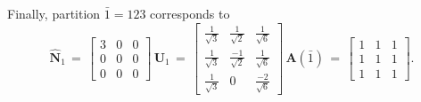 \documentclass[twocolumn,aps,sort,nofootinbib]{revtex4}
\begin{document}
Finally, partition ${\bar 1}=123$ corresponds to
\begin{subequations}
\begin{equation}
\mathbf{\hat{N}}_1\,=\,
\begin{bmatrix}
3 & 0 & 0\\
0 & 0 & 0\\
0 & 0 & 0
\end{bmatrix}
\,
\mathbf{U}_1\,=\,
\begin{bmatrix}
\frac{1}{\sqrt{3}} & \frac{1}{\sqrt{2}}  & \frac{1}{\sqrt{6}} \\
\frac{1}{\sqrt{3}} & \frac{-1}{\sqrt{2}} & \frac{1}{\sqrt{6}} \\
\frac{1}{\sqrt{3}} & 0                   & \frac{-2}{\sqrt{6}}
\end{bmatrix}
\,
\mathbf{A}({\bar 1})\,=\,
\begin{bmatrix}
1 & 1 & 1\\
1 & 1 & 1\\
1 & 1 & 1
\end{bmatrix}.
\end{equation}
\end{subequations}
\end{document}
